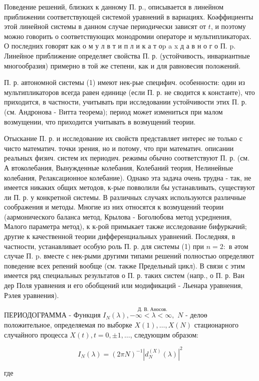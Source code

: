 \documentclass[10pt]{article}
\begin{document}
Поведение решений, близких к данному П. р., описывается в линейном приближении соответствующей системой уравнений в вариациях. Коәффициенты этой линейной системы в данном случае периодически зависят от $t$, и поэтому можно говорить о соответствующих монодромии операторе и мультипликаторах. О последних говорят как о м у л в т и п л и к а т оp a x д а в н о г о П. p. Линейное приближение определяет свойства П. р. (устойчивость, инвариантные многообразия) примерно в той же степени, как и для равновесия положений.

П. р. автономной системы (1) имеют нек-рые специфич. особенности: один из мультипликаторов всегда равен единице (если П. р. не сводится к константе), что приходится, в частности, учитывать при исследовании устойчивости этих П. р. (см. Андронова - Bитта теорема); период может измениться при малом возмущении, что приходится учитывать в возмущений теории.

Отыскание П. р. и исследование их свойств представляет интерес не только с чисто математич. точки зрения, но и потому, что при математич. описании реальных физич. систем их периодич. режимы обычно соответствуют П. р. (см. А втоколебания, Вынужденные колебания, Колебаний теория, Нелинейные колебания, Релаксационное колебание). Однако эта задача очень трудна - так, не имеется никаких общих методов, к-рые повволили бы устанавливать, существуют ли П. р. у конкретной системы. В различных случаях используются различные соображения и методы. Многие из них относятся к возмущений теории (аармонического баланса метод, Крылова - Боголюбова метод усреднения, Малого параметра метод), к к-рой примыкает также исследование бифуркачий; другие к качественной теории дифференциальных уравнений. Последняя, в частности, устанавливает особую роль П. р. для системы (1) при $n=2:$ в әтом случае П. p. вместе с нек-рыми другими типами решений полностью определяют поведение всех репений вообще (см. также Предельный цикл). В связи с этим имеется ряд специальных результатов о П. р. таких систем (напр., о П. р. Ван дер Поля уравнения и его обобщений или модификаций - Льенара уравнения, Рэлея уравнения).

ПЕРИОДОГРАММА - Функция $I_{N}(\lambda), \stackrel{\text { Д. В. Аносов. }}{-\infty<\lambda<\infty,}$ $N$ - делоө положительное, определяемая по выборке $X(1), \ldots, X(N)$ стационарного случайного процесса $X(t), t=0, \pm 1, \ldots$, следующим образом:

\[
I_{N}(\lambda)=(2 \pi N)^{-1}\left|d_{N}^{(X)}(\lambda)\right|^{2}
\]

где
\end{document}
